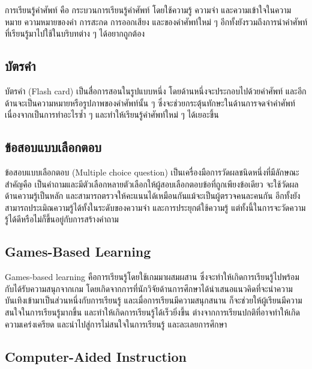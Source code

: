 \documentclass[12pt,oneside,openright,a4paper]{cpe-thai-project}
\begin{document}
\hspace{1cm}
การเรียนรู้คำศัพท์ คือ กระบวนการเรียนรู้คำศัพท์ โดยใช้ความรู้ ความจำ และความเข้าใจในความหมาย ความหมายของคำ
การสะกด การออกเสียง และของคำศัพท์ใหม่ ๆ อีกทั้งยังรวมถึงการนำคำศัพท์ที่เรียนรู้มาไปใช้ในบริบทต่าง ๆ ได้อยากถูกต้อง

\subsection{บัตรคำ}

\hspace{1cm}
บัตรคำ (Flash card) เป็นสื่อการสอนในรูปแบบหนึ่ง โดยด้านหนึ่งจะประกอบไปด้วยคำศัพท์
และอีกด้านจะเป็นความหมายหรือรูปภาพของคำศัพท์นั้น ๆ ซึ่งจะช่วยกระตุ้นทักษะในด้านการจดจำคำศัพท์
เนื่องจากเป็นการทำอะไรซ้ำ ๆ และทำให้เรียนรู้คำศัพท์ใหม่ ๆ ได้เยอะขึ้น

\subsection{ข้อสอบแบบเลือกตอบ}

\hspace{1cm}
ข้อสอบแบบเลือกตอบ (Multiple choice question) เป็นเครื่องมือการวัดผลชนิดหนึ่งที่มีลักษณะสำคัญคือ
เป็นคำถามและมีตัวเลือกหลายตัวเลือกให้ผู้สอบเลือกตอบข้อที่ถูกเพียงข้อเดียว จะใช้วัดผลด้านความรู้เป็นหลัก
และสามารถตรวจให้คะแนนได้เหมือนกันแม้จะเป็นผู้ตรวจคนละคนกัน อีกทั้งยังสามารถประเมิณความรู้ได้ทั้งในระดับของความจำ
และการประยุกต์ใช้ความรู้ แต่ทั้งนี้ในการจะวัดความรู้ได้ดีหรือไม่ก็ขึ้นอยู่กับการสร้างคำถาม

\subsection{Games-Based Learning \cite{GBL}}

\hspace{1cm}
Games-based learning คือการเรียนรู้โดยใช้เกมมาผสมผสาน ซึ่งจะทำให้เกิดการเรียนรู้ไปพร้อมกับได้รับความสนุกจากเกม
โดยเกิดจากการที่นักวิจัยด้านการศึกษาได้นำเสนอแนวคิดที่จะนำความบันเทิงเข้ามาเป็นส่วนหนึ่งกับการเรียนรู้ และเมื่อการเรียนมีความสนุกสนาน
ก็จะช่วยให้ผู้เรียนมีความสนใจในการเรียนรู้มากขึ้น และทำให้เกิดการเรียนรู้ได้เร็วยิ่งขึ้น ต่างจากการเรียนปกติที่อาจทำให้เกิดความเคร่งเครียด
และนำไปสู่การไม่สนใจในการเรียนรู้ และละเลยการศึกษา

\subsection{Computer-Aided Instruction \cite{CAI1,CAI2}}
\end{document}
